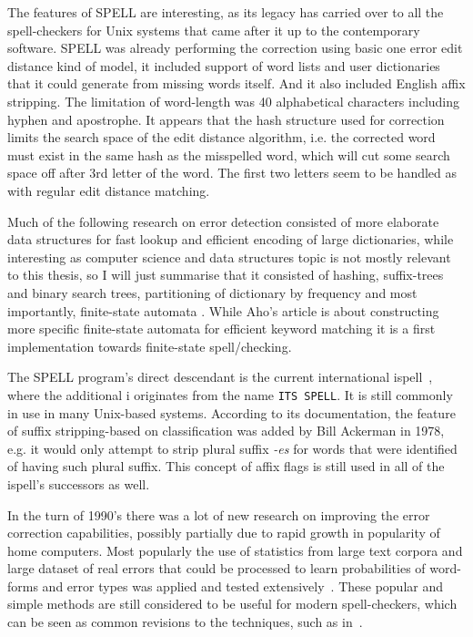 \documentclass[officiallayout]{unihelcompling}
\begin{document}
The features of SPELL are interesting, as its legacy has carried over to all
the spell-checkers for Unix systems that came after it up to the contemporary
software.  SPELL was already performing the correction using basic one error
edit distance kind of model, it included support of word lists and user
dictionaries that it could generate from missing words itself. And it also
included English affix
stripping. The limitation of word-length was 40 alphabetical characters
including hyphen and apostrophe. It appears that the hash structure used for
correction limits the search space of the edit distance algorithm, i.e. the
corrected word must exist in the same hash as the misspelled word, which will
cut some search space off after 3rd letter of the word. The first two letters
seem to be handled as with regular edit distance matching.
\citep{gorin1971spell}

Much of the following research on error detection consisted of more elaborate
data structures for fast lookup and efficient encoding of large dictionaries,
while interesting as computer science and data structures topic is not mostly
relevant to this thesis, so I will just summarise that it consisted of hashing,
suffix-trees and binary search trees, partitioning of dictionary by frequency
\citep{knuth1973art} and most importantly, finite-state automata
\citep{aho1975efficient}. While Aho's article is about constructing more
specific finite-state automata for efficient keyword matching it is a first
implementation towards finite-state spell\-/checking.

The SPELL program's direct descendant is the current international
ispell~\citep{gorin1971spell}, where the additional i originates from the name
\texttt{ITS SPELL}. It is still commonly in use in many Unix-based systems.
According to its documentation, the feature of suffix stripping-based on
classification was added by Bill Ackerman in 1978, e.g. it would only attempt
to strip plural suffix \emph{-es} for words that were identified of having such
plural suffix.  This concept of affix flags is still used in all of the
ispell's successors as well.

In the turn of 1990's there was a lot of new research on improving the error
correction capabilities, possibly partially due to rapid growth in popularity
of home computers. Most popularly the use of statistics from large text corpora
and large dataset of real errors that could be processed to learn probabilities
of word-forms and error types was applied and tested
extensively~\citep{kernighan1990spelling,church1991probability}. These popular
and simple methods are still considered to be useful for modern spell-checkers,
which can be seen as common revisions to the techniques, such as
in~\citet{brill2000improved}.
\end{document}
